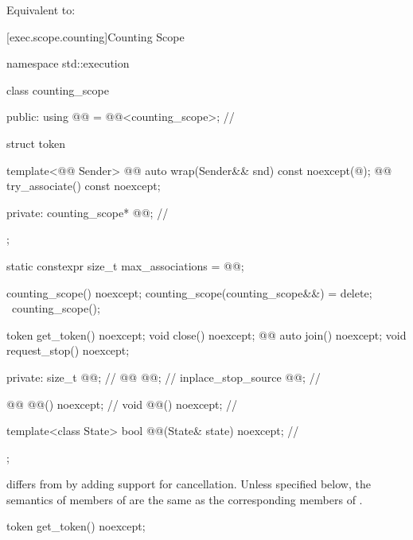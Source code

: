 \begin{itemdescr}
\pnum
\effects
Equivalent to: 
\end{itemdescr}

[exec.scope.counting]{Counting Scope}

%
%
\begin{codeblock}
namespace std::execution {
  class counting_scope {
  public:
    using @@ = @@<counting_scope>;      // \expos

    struct token {
      template<@@ Sender>
        @@ auto wrap(Sender&& snd) const noexcept(@\seebelow@);
      @@ try_associate() const noexcept;

    private:
      counting_scope* @@;                            // \expos
    };

    static constexpr size_t max_associations = @@;

    counting_scope() noexcept;
    counting_scope(counting_scope&&) = delete;
    ~counting_scope();

    token get_token() noexcept;
    void close() noexcept;
    @@ auto join() noexcept;
    void request_stop() noexcept;

  private:
    size_t @@;                                       // \expos
    @@ @@;                             // \expos
    inplace_stop_source @@;                       // \expos

    @@ @@() noexcept;                   // \expos
    void @@() noexcept;                       // \expos

    template<class State>
      bool @@(State& state) noexcept;    // \expos
  };
}
\end{codeblock}

\pnum
{} differs from  by
adding support for cancellation.
Unless specified below, the semantics of members of 
are the same as the corresponding members of .

%
\begin{itemdecl}
token get_token() noexcept;
\end{itemdecl}

